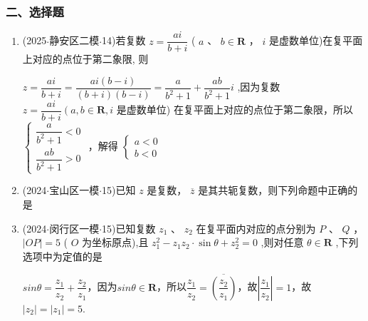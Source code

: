 \subsubsection*{二、选择题}
\begin{enumerate}
    \item (2025$\cdot$静安区二模$\cdot$14)若复数 $z = \dfrac{a{i}}{b + {i}}$ ( $a$ 、 $b \in  \mathbf{R}$ ， ${i}$ 是虚数单位)在复平面上对应的点位于第二象限, 则 
    \begin{jieda}
        $z = \dfrac{a{i}}{b + {i}} = \dfrac{a{i}\left( {b - {i}}\right) }{\left( {b + {i}}\right) \left( {b - {i}}\right) } = \dfrac{a}{{b}^{2} + 1} + \dfrac{ab}{{b}^{2} + 1}{i}$ ,因为复数 $z = \dfrac{a{i}}{b + {i}}\left( {a,b \in  \mathbf{R},{i}}\right.$ 是虚数单位) 在复平面上对应的点位于第二象限，所以 $\left\{  \begin{array}{l} \dfrac{a}{{b}^{2} + 1} < 0 \\  \dfrac{ab}{{b}^{2} + 1} > 0 \end{array}\right.$ ，解得 $\left\{  \begin{array}{l} a < 0 \\  b < 0 \end{array}\right.$
    \end{jieda}

    \item (2024$\cdot$宝山区一模$\cdot$15)已知 $z$ 是复数， $\overline{z}$ 是其共轭复数，则下列命题中正确的是 

    \item (2024$\cdot$闵行区一模$\cdot$15)已知复数 ${z}_{1}$ 、 ${z}_{2}$ 在复平面内对应的点分别为 $P$ 、 $Q$ ， $\left| {OP}\right|  = 5$ ( $O$ 为坐标原点),且 ${z}_{1}^{2} - {z}_{1}{z}_{2} \cdot  \sin \theta  + {z}_{2}^{2} = 0$ ,则对任意 $\theta  \in  \mathbf{R}$ ,下列选项中为定值的是 
    \begin{jieda}
        $sin\theta = \dfrac{z_1}{z_2} + \dfrac{z_2}{z_1}$，因为$sin\theta \in \mathbf{R}$，所以$\dfrac{z_1}{z_2} = \overline{\left(\dfrac{z_2}{z_1}\right)}$，故$\left|\dfrac{z_1}{z_2}\right| = 1$，故$|z_2| = |z_1| = 5$.
    \end{jieda}
\end{enumerate}
